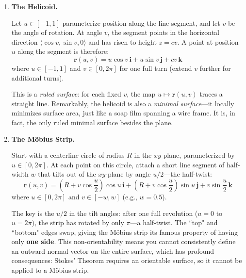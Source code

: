 \begin{example}
\begin{solution}
\begin{enumerate}
At angle $v$ around the tube, a point on the circle of radius $a$ sits at distance $R + a\cos v$ from the $z$-axis and at height $a\sin v$. Revolving this point around the $z$-axis by angle $u$ gives:
\[
\mathbf{r}(u,v) = (R + a\cos v)\cos u\,\mathbf{i} + (R + a\cos v)\sin u\,\mathbf{j} + a\sin v\,\mathbf{k}
\]

\textit{Verification:} When $v = 0$, the point is at distance $R + a$ from the $z$-axis (outer equator). When $v = \pi$, the distance is $R - a$ (inner equator). To find the scalar equation, observe that $\sqrt{x^2 + y^2} = R + a\cos v$ and $z = a\sin v$, so:
\[
\left(\sqrt{x^2 + y^2} - R\right)^2 + z^2 = a^2\cos^2 v + a^2\sin^2 v = a^2
\]

\item \textbf{The Helicoid.}

Let $u \in [-1, 1]$ parameterize position along the line segment, and let $v$ be the angle of rotation. At angle $v$, the segment points in the horizontal direction $\langle \cos v, \sin v, 0 \rangle$ and has risen to height $z = cv$. A point at position $u$ along the segment is therefore:
\[
\mathbf{r}(u,v) = u\cos v\,\mathbf{i} + u\sin v\,\mathbf{j} + cv\,\mathbf{k}
\]
where $u \in [-1, 1]$ and $v \in [0, 2\pi]$ for one full turn (extend $v$ further for additional turns).

This is a \textit{ruled surface}: for each fixed $v$, the map $u \mapsto \mathbf{r}(u,v)$ traces a straight line. Remarkably, the helicoid is also a \textit{minimal surface}---it locally minimizes surface area, just like a soap film spanning a wire frame. It is, in fact, the only ruled minimal surface besides the plane.

\item \textbf{The Möbius Strip.}

Start with a centerline circle of radius $R$ in the $xy$-plane, parameterized by $u \in [0, 2\pi]$. At each point on this circle, attach a short line segment of half-width $w$ that tilts out of the $xy$-plane by angle $u/2$---the half-twist:
\[
\mathbf{r}(u,v) = \left(R + v\cos\frac{u}{2}\right)\cos u\,\mathbf{i} + \left(R + v\cos\frac{u}{2}\right)\sin u\,\mathbf{j} + v\sin\frac{u}{2}\,\mathbf{k}
\]
where $u \in [0, 2\pi]$ and $v \in [-w, w]$ (e.g., $w = 0.5$).

The key is the $u/2$ in the tilt angles: after one full revolution ($u = 0$ to $u = 2\pi$), the strip has rotated by only $\pi$---a half-twist. The ``top" and ``bottom" edges swap, giving the Möbius strip its famous property of having only \textbf{one side}. This non-orientability means you cannot consistently define an outward normal vector on the entire surface, which has profound consequences: Stokes' Theorem requires an orientable surface, so it cannot be applied to a Möbius strip.
\end{enumerate}
\end{solution}
\end{example}
\exampleline

